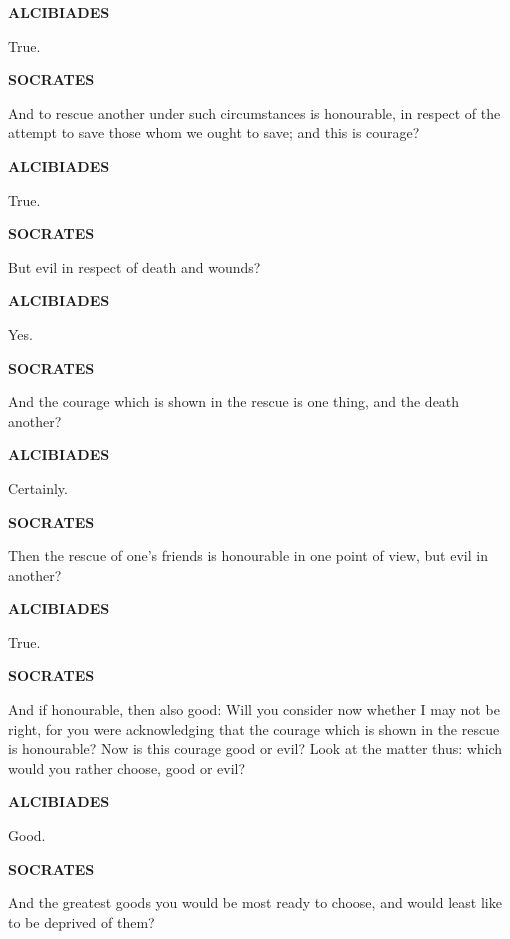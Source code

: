 \documentclass[11pt,letter]{article}
\begin{document}
\par \textbf{ALCIBIADES}
\par   True.

\par \textbf{SOCRATES}
\par   And to rescue another under such circumstances is honourable, in respect of the attempt to save those whom we ought to save; and this is courage?

\par \textbf{ALCIBIADES}
\par   True.

\par \textbf{SOCRATES}
\par   But evil in respect of death and wounds?

\par \textbf{ALCIBIADES}
\par   Yes.

\par \textbf{SOCRATES}
\par   And the courage which is shown in the rescue is one thing, and the death another?

\par \textbf{ALCIBIADES}
\par   Certainly.

\par \textbf{SOCRATES}
\par   Then the rescue of one's friends is honourable in one point of view, but evil in another?

\par \textbf{ALCIBIADES}
\par   True.

\par \textbf{SOCRATES}
\par   And if honourable, then also good:  Will you consider now whether I may not be right, for you were acknowledging that the courage which is shown in the rescue is honourable? Now is this courage good or evil? Look at the matter thus:  which would you rather choose, good or evil?

\par \textbf{ALCIBIADES}
\par   Good.

\par \textbf{SOCRATES}
\par   And the greatest goods you would be most ready to choose, and would least like to be deprived of them?
\end{document}
